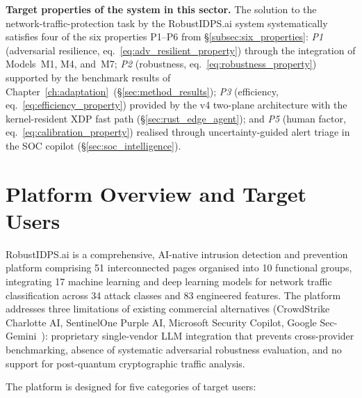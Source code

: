 \noindent\textbf{Target properties of the system in this sector.}
The solution to the network-traffic-protection task by the
\textsf{RobustIDPS.ai} system systematically satisfies four of the
six properties P1--P6 from \S\ref{subsec:six_properties}:
\emph{P1} (adversarial resilience, eq.~\eqref{eq:adv_resilient_property})
through the integration of Models~M1, M4, and~M7;
\emph{P2} (robustness, eq.~\eqref{eq:robustness_property})
supported by the benchmark results of
Chapter~\ref{ch:adaptation}~(\S\ref{sec:method_results});
\emph{P3} (efficiency, eq.~\eqref{eq:efficiency_property})
provided by the v4 two-plane architecture with the kernel-resident
XDP fast path (\S\ref{sec:rust_edge_agent}); and
\emph{P5} (human factor, eq.~\eqref{eq:calibration_property})
realised through uncertainty-guided alert triage in the SOC
copilot (\S\ref{sec:soc_intelligence}).





\section{Platform Overview and Target Users}
\label{sec:platform_overview}

RobustIDPS.ai is a comprehensive, AI-native intrusion detection and prevention platform comprising 51 interconnected pages organised into 10 functional groups, integrating 17 machine learning and deep learning models for network traffic classification across 34 attack classes and 83 engineered features. The platform addresses three limitations of existing commercial alternatives (CrowdStrike Charlotte AI, SentinelOne Purple AI, Microsoft Security Copilot, Google Sec-Gemini~\cite{Smith2023}): proprietary single-vendor LLM integration that prevents cross-provider benchmarking, absence of systematic adversarial robustness evaluation, and no support for post-quantum cryptographic traffic analysis.

The platform is designed for five categories of target users:


